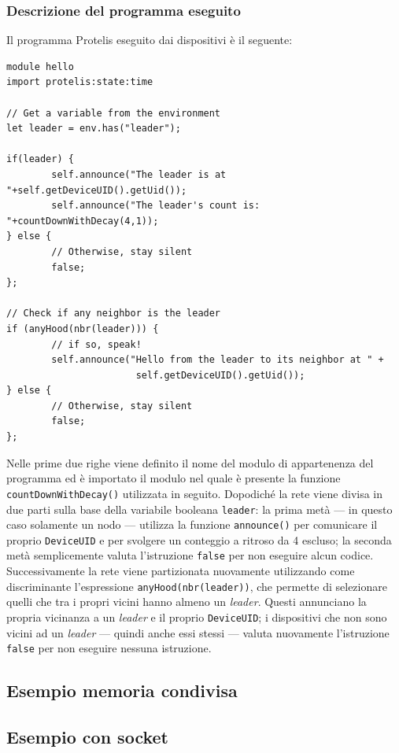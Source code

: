 \subsubsection{Descrizione del programma eseguito}
Il programma Protelis eseguito dai dispositivi è il seguente:
\begin{verbatim}
module hello
import protelis:state:time

// Get a variable from the environment
let leader = env.has("leader");

if(leader) {
        self.announce("The leader is at "+self.getDeviceUID().getUid());
        self.announce("The leader's count is: "+countDownWithDecay(4,1));
} else {
        // Otherwise, stay silent
        false;
};

// Check if any neighbor is the leader
if (anyHood(nbr(leader))) {
        // if so, speak!
        self.announce("Hello from the leader to its neighbor at " +
                       self.getDeviceUID().getUid());
} else {
        // Otherwise, stay silent
        false;
};
\end{verbatim}
Nelle prime due righe viene definito il nome del modulo di appartenenza del
programma ed è importato il modulo nel quale è presente la funzione
\texttt{countDownWithDecay()} utilizzata in seguito. Dopodiché la rete viene
divisa in due parti sulla base della variabile booleana \texttt{leader}: la
prima metà --- in questo caso solamente un nodo --- utilizza la funzione
\texttt{announce()} per comunicare il proprio \texttt{DeviceUID} e per svolgere
un conteggio a ritroso da 4 escluso; la seconda metà semplicemente valuta
l'istruzione \texttt{false} per non eseguire alcun codice.
Successivamente la rete viene partizionata nuovamente utilizzando come
discriminante l'espressione \texttt{anyHood(nbr(leader))}, che permette di
selezionare quelli che tra i propri vicini hanno almeno un \textit{leader}.
Questi annunciano la propria vicinanza a un \textit{leader} e il proprio
\texttt{DeviceUID}; i dispositivi che non sono vicini ad un \textit{leader} ---
quindi anche essi stessi --- valuta nuovamente l'istruzione \texttt{false} per
non eseguire nessuna istruzione.


\subsection{Esempio memoria condivisa}

\subsection{Esempio con socket}

